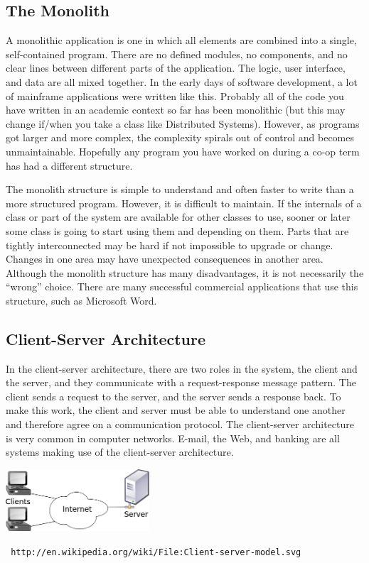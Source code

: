\subsection*{The Monolith}
A monolithic application is one in which all elements are combined into a single, self-contained program. There are no defined modules, no components, and no clear lines between different parts of the application. The logic, user interface, and data are all mixed together. In the early days of software development, a lot of mainframe applications were written like this. Probably all of the code you have written in an academic context so far has been monolithic (but this may change if/when you take a class like Distributed Systems). However, as programs got larger and more complex, the complexity spirals out of control and becomes unmaintainable. Hopefully any program you have worked on during a co-op term has had a different structure.

The monolith structure is simple to understand and often faster to write than a more structured program. However, it is difficult to maintain. If the internals of a class or part of the system are available for other classes to use, sooner or later some class is going to start using them and depending on them. Parts that are tightly interconnected may be hard if not impossible to upgrade or change. Changes in one area may have unexpected consequences in another area. Although the monolith structure has many disadvantages, it is not necessarily the ``wrong'' choice. There are many successful commercial applications that use this structure, such as Microsoft Word.


\subsection*{Client-Server Architecture}
In the client-server architecture, there are two roles in the system, the client and the server, and they communicate with a request-response message pattern. The client sends a request to the server, and the server sends a response back. To make this work, the client and server must be able to understand one another and therefore agree on a communication protocol. The client-server architecture is very common in computer networks. E-mail, the Web, and banking are all systems making use of the client-server architecture.

\begin{center}
	\includegraphics[width=0.4\textwidth]{images/Client-server-model.png}
	
	\texttt{\small
 http://en.wikipedia.org/wiki/File:Client-server-model.svg}
\end{center}

